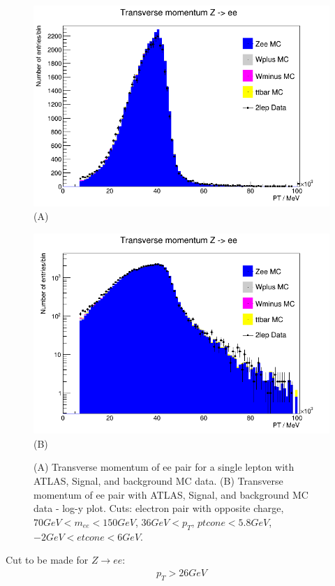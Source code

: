 \begin{figure}[h!]
    \centering
    \begin{minipage}{0.5\textwidth}
        \centering
        \includegraphics[width=\linewidth]{plots/03-03-2021/09-48_03-03-21.png}
        (A)
    \end{minipage}\hfill
    \begin{minipage}{0.5\textwidth}
        \centering
        \includegraphics[width=\linewidth]{plots/03-03-2021/09-49_03-03-21.png}
        (B)
    \end{minipage}
    \caption{(A) Transverse momentum of ee pair for a single lepton with ATLAS, Signal, and background MC data. (B) Transverse momentum of ee pair with ATLAS, Signal, and background MC data - log-y plot.  Cuts: electron pair with opposite charge, $70 GeV < m_{ee} < 150 GeV$, $36 GeV < p_T$, $ ptcone < 5.8 GeV$, $ -2 GeV < etcone < 6 GeV$.}
    \label{fig:09-48_03-03-21}
\end{figure}
Cut to be made for $Z \rightarrow ee$:
\begin{align}
    p_T > 26 GeV    
\end{align}


